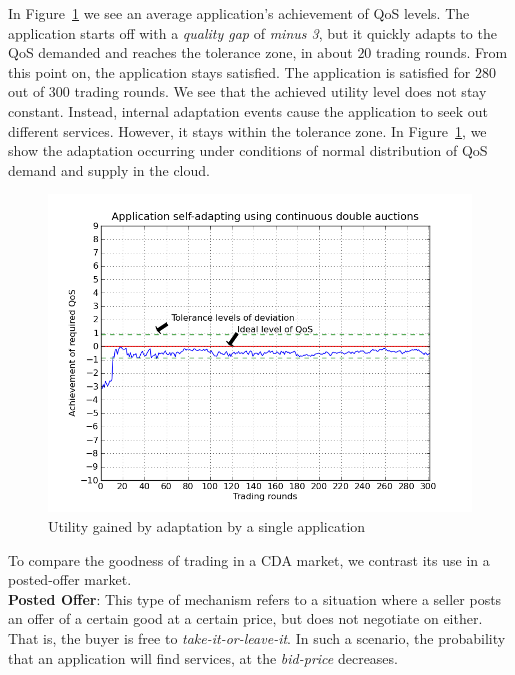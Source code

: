 \documentclass[10pt,journal,compsoc]{IEEEtran}
\begin{document}
In Figure~\ref{fig:goodness_cda} we see an average application's achievement of QoS levels. The application starts off with a \textit{quality gap} of \textit{minus 3}, but it quickly adapts to the QoS demanded and reaches the tolerance zone, in about $20$ trading rounds. From this point on, the application stays satisfied. The application is satisfied for $280$ out of $300$ trading rounds. We see that the achieved utility level does not stay constant. Instead, internal adaptation events cause the application to seek out different services. However, it stays within the tolerance zone. In Figure~\ref{fig:goodness_cda}, we show the adaptation occurring  under conditions of normal distribution of QoS demand and supply in the cloud. 
 \begin{figure}[h]
 	\centering
    \includegraphics[scale=0.45]{graphs/Single_App_Self_Adaptation_Across_Rounds_With_QA_Change.png}
    \caption{Utility gained by adaptation by a single application \label{fig:goodness_cda}}
\end{figure}	 

To compare the goodness of trading in a CDA market, we contrast its use in a posted-offer market.\\
\textbf{Posted Offer}: This type of mechanism refers to a situation where a seller posts an offer of a certain good at a certain price, but does not negotiate on either. That is, the buyer is free to \textit{take-it-or-leave-it}.  In such a scenario, the probability that an application will find services, at the \textit{bid-price} decreases. 
\end{document}
